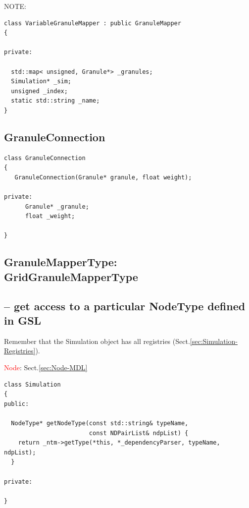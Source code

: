 NOTE:
\begin{lstlisting}
class VariableGranuleMapper : public GranuleMapper
{

private: 

  std::map< unsigned, Granule*> _granules;
  Simulation* _sim;
  unsigned _index;
  static std::string _name;
}

\end{lstlisting}




\subsection{GranuleConnection}
\label{sec:GranuleConnection}

\begin{lstlisting}
class GranuleConnection
{
   GranuleConnection(Granule* granule, float weight);

private:
      Granule* _granule;
      float _weight;

}
\end{lstlisting}


\subsection{GranuleMapperType: GridGranuleMapperType}
\label{sec:GranuleMapperType}
\label{sec:GridGranuleMapperType}

\subsection{-- get access to a particular NodeType defined in GSL}

Remember that the Simulation object has all registries
(Sect.\ref{sec:Simulation-Registries}).

\textcolor{red}{Node}: Sect.\ref{sec:Node-MDL}

\begin{lstlisting}
class Simulation
{
public:

  NodeType* getNodeType(const std::string& typeName,
                        const NDPairList& ndpList) {
    return _ntm->getType(*this, *_dependencyParser, typeName, ndpList);
  }

private:
  
}
\end{lstlisting}

